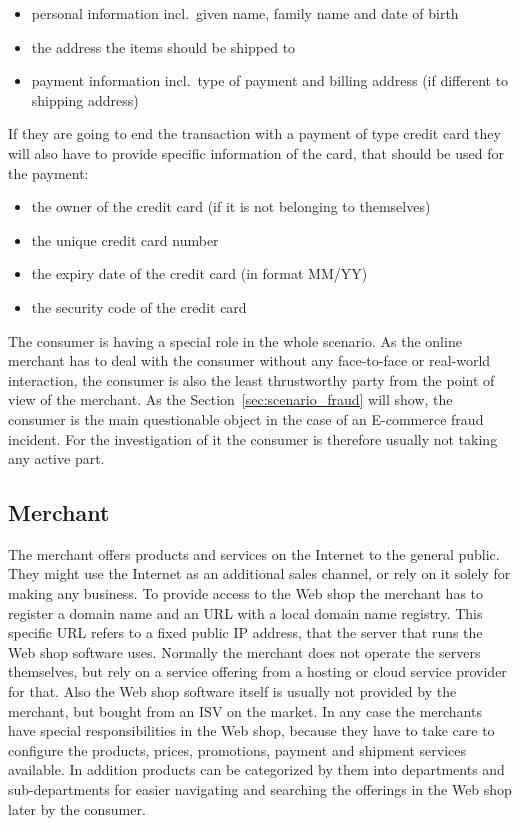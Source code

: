 \begin{itemize}
		\item personal information incl.\ given name, family name and date of birth
		\item the address the items should be shipped to
		\item payment information incl.\ type of payment and billing address (if different to shipping address)
\end{itemize}

If they are going to end the transaction with a payment of type credit card they will also have to provide specific information of the card, that should be used for the payment:\@

\begin{itemize}
		\item the owner of the credit card (if it is not belonging to themselves)
		\item the unique credit card number
		\item the expiry date of the credit card (in format MM/YY)
		\item the security code of the credit card
\end{itemize}

The consumer is having a special role in the whole scenario. As the online merchant has to deal with the consumer without any face-to-face or real-world interaction, the consumer is also the least thrustworthy party from the point of view of the merchant. As the Section~\ref{sec:scenario_fraud} will show, the consumer is the main questionable object in the case of an \gls{E-commerce} fraud incident. For the investigation of it the consumer is therefore usually not taking any active part.


\subsection{Merchant}
\label{subsec:stakeholder_merchant}

The merchant offers products and services on the Internet to the general public. They might use the Internet as an additional sales channel, or rely on it solely for making any business. To provide access to the Web shop the merchant has to register a domain name and an \gls{URL} with a local domain name registry. This specific \gls{URL} refers to a fixed public \gls{IP} address, that the server that runs the Web shop software uses. Normally the merchant does not operate the servers themselves, but rely on a service offering from a hosting or cloud service provider for that. Also the Web shop software itself is usually not provided by the merchant, but bought from an \gls{ISV} on the market. In any case the merchants have special responsibilities in the Web shop, because they have to take care to configure the products, prices, promotions, payment and shipment services available. In addition products can be categorized by them into departments and sub-departments for easier navigating and searching the offerings in the Web shop later by the consumer. \\

